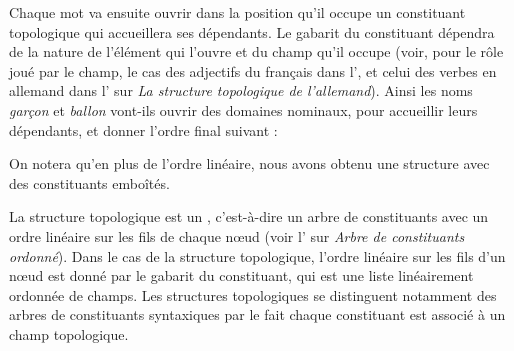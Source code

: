 Chaque mot va ensuite ouvrir dans la position qu’il occupe un constituant topologique qui accueillera ses dépendants. Le gabarit du constituant dépendra de la nature de l’élément qui l’ouvre et du champ qu’il occupe (voir, pour le rôle joué par le champ, le cas des adjectifs du français dans l’, et celui des verbes en allemand dans l’ sur \textit{La structure topologique de l’allemand}). Ainsi les noms \textit{garçon} et \textit{ballon} vont-ils ouvrir des domaines nominaux, pour accueillir leurs dépendants, et donner l’ordre final suivant :

\ea\label{ex:topo-ballon}%
\z
{}

On notera qu’en plus de l’ordre linéaire, nous avons obtenu une structure avec des constituants emboîtés.


La structure topologique est un , c’est-à-dire un arbre de constituants  avec un ordre linéaire sur les fils de chaque nœud (voir l’ sur \textit{Arbre de constituants ordonné}). Dans le cas de la structure topologique, l’ordre linéaire sur les fils d’un nœud est donné par le gabarit du constituant, qui est une liste linéairement ordonnée de champs. Les structures topologiques se distinguent notamment des arbres de constituants syntaxiques par le fait chaque constituant est associé à un champ topologique.

